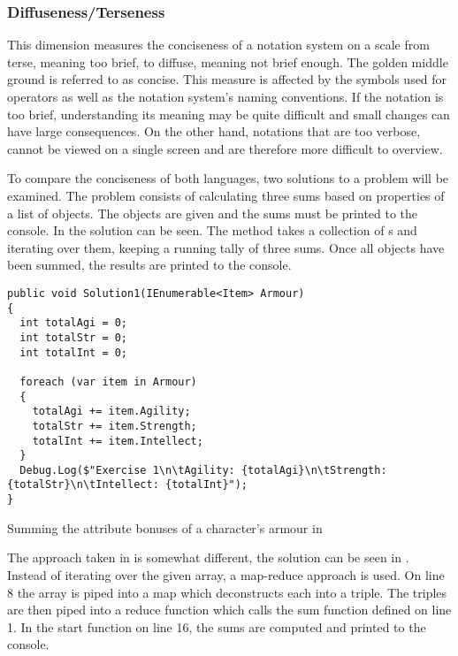 \subsubsection{Diffuseness/Terseness} %
This dimension measures the conciseness of a notation system on a scale from terse, meaning too brief, to diffuse, meaning not brief enough. The golden middle ground is referred to as concise. This measure is affected by the symbols used for operators as well as the notation system's naming conventions. If the notation is too brief, understanding its meaning may be quite difficult and small changes can have large consequences. On the other hand, notations that are too verbose, cannot be viewed on a single screen and are therefore more difficult to overview.

To compare the conciseness of both languages, two solutions to a problem will be examined. The problem consists of calculating three sums based on properties of a list of objects. The objects are given and the sums must be printed to the console. In  the \cs solution can be seen. The method takes a collection of s and iterating over them, keeping a running tally of three sums. Once all objects have been summed, the results are printed to the console.

\begin{listing}[H]
\begin{verbatim}
public void Solution1(IEnumerable<Item> Armour)
{
  int totalAgi = 0;
  int totalStr = 0;
  int totalInt = 0;

  foreach (var item in Armour)
  {
    totalAgi += item.Agility;
    totalStr += item.Strength;
    totalInt += item.Intellect;
  }
  Debug.Log($"Exercise 1\n\tAgility: {totalAgi}\n\tStrength: {totalStr}\n\tIntellect: {totalInt}");
}
\end{verbatim}
\caption{Summing the attribute bonuses of a character's armour in \cs}
\label{lst:cs-armour}
\end{listing}

The approach taken in \fs is somewhat different, the solution can be seen in . Instead of iterating over the given array, a map-reduce approach is used. On line 8 the array is piped into a map which deconstructs each  into a triple. The triples are then piped into a reduce function which calls the sum function defined on line 1. In the start function on line 16, the sums are computed and printed to the console.

